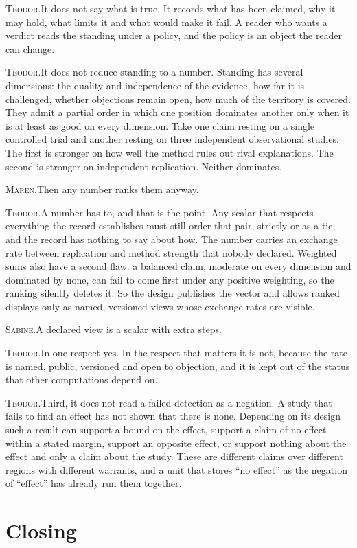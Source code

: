 \documentclass[11pt]{article}
\newcommand{\say}[2]{\par\noindent\textsc{#1.}\enspace #2\par}
\newcommand{\MA}[1]{\say{Maren}{#1}}
\newcommand{\TE}[1]{\say{Teodor}{#1}}
\newcommand{\SA}[1]{\say{Sabine}{#1}}
\begin{document}
\TE{It does not say what is true. It records what has been claimed, why it may hold, what limits it and what would make it fail. A reader who wants a verdict reads the standing under a policy, and the policy is an object the reader can change.}

\TE{It does not reduce standing to a number. Standing has several dimensions: the quality and independence of the evidence, how far it is challenged, whether objections remain open, how much of the territory is covered. They admit a partial order in which one position dominates another only when it is at least as good on every dimension. Take one claim resting on a single controlled trial and another resting on three independent observational studies. The first is stronger on how well the method rules out rival explanations. The second is stronger on independent replication. Neither dominates.}

\MA{Then any number ranks them anyway.}

\TE{A number has to, and that is the point. Any scalar that respects everything the record establishes must still order that pair, strictly or as a tie, and the record has nothing to say about how. The number carries an exchange rate between replication and method strength that nobody declared. Weighted sums also have a second flaw: a balanced claim, moderate on every dimension and dominated by none, can fail to come first under any positive weighting, so the ranking silently deletes it. So the design publishes the vector and allows ranked displays only as named, versioned views whose exchange rates are visible.}

\SA{A declared view is a scalar with extra steps.}

\TE{In one respect yes. In the respect that matters it is not, because the rate is named, public, versioned and open to objection, and it is kept out of the status that other computations depend on.}

\TE{Third, it does not read a failed detection as a negation. A study that fails to find an effect has not shown that there is none. Depending on its design such a result can support a bound on the effect, support a claim of no effect within a stated margin, support an opposite effect, or support nothing about the effect and only a claim about the study. These are different claims over different regions with different warrants, and a unit that stores ``no effect'' as the negation of ``effect'' has already run them together.}

\section{Closing}
\end{document}
